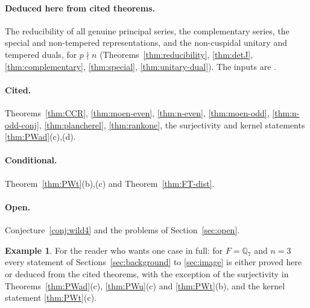 \documentclass[12pt,letterpaper]{article}
\numberwithin{equation}{section}
\theoremstyle{definition}
\newtheorem{example}[theorem]{Example}
\newcommand{\Q}{\mathbb Q}
\begin{document}
\paragraph{Deduced here from cited theorems.}  The reducibility of all genuine principal
series, the complementary series, the special and non-tempered representations, and the
non-cuspidal unitary and tempered duals, for $p\nmid n$
(Theorems~\ref{thm:reducibility}, \ref{thm:detJ}, \ref{thm:complementary},
\ref{thm:special}, \ref{thm:unitary-dual}).  The inputs are \cite{GS16,He25,BJ13,KS23}.

\paragraph{Cited.}  Theorems~\ref{thm:CCR}, \ref{thm:moen-even}, \ref{thm:n-even},
\ref{thm:moen-odd}, \ref{thm:n-odd-conj}, \ref{thm:plancherel}, \ref{thm:rankone}, the
surjectivity and kernel statements \ref{thm:PWad}(c),(d).

\paragraph{Conditional.}  Theorem~\ref{thm:PWt}(b),(c) and Theorem~\ref{thm:FT-dist}.

\paragraph{Open.}  Conjecture~\ref{conj:wild4} and the problems of
Section~\ref{sec:open}.

\begin{example}\label{ex:summary}
For the reader who wants one case in full: for $F=\Q_7$ and $n=3$ every statement of
Sections~\ref{sec:background} to \ref{sec:image} is either proved here or deduced from the
cited theorems, with the exception of the surjectivity in
Theorems~\ref{thm:PWad}(c), \ref{thm:PWu}(c) and \ref{thm:PWt}(b), and the kernel statement
\ref{thm:PWt}(c).
\end{example}

\end{document}
